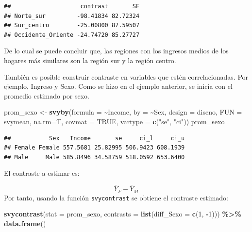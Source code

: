 \documentclass[
  spanish,
  12pt,
]{book}
\newenvironment{Shaded}{\begin{snugshade}}{\end{snugshade}}
\newcommand{\AttributeTok}[1]{\textcolor[rgb]{0.13,0.29,0.53}{#1}}
\newcommand{\ConstantTok}[1]{\textcolor[rgb]{0.56,0.35,0.01}{#1}}
\newcommand{\DecValTok}[1]{\textcolor[rgb]{0.00,0.00,0.81}{#1}}
\newcommand{\FunctionTok}[1]{\textcolor[rgb]{0.13,0.29,0.53}{\textbf{#1}}}
\newcommand{\NormalTok}[1]{#1}
\newcommand{\OtherTok}[1]{\textcolor[rgb]{0.56,0.35,0.01}{#1}}
\newcommand{\SpecialCharTok}[1]{\textcolor[rgb]{0.81,0.36,0.00}{\textbf{#1}}}
\newcommand{\StringTok}[1]{\textcolor[rgb]{0.31,0.60,0.02}{#1}}
\begin{document}
\begin{verbatim}
##                    contrast       SE
## Norte_sur         -98.41834 82.72324
## Sur_centro        -25.00800 87.59507
## Occidente_Oriente -24.74720 85.27727
\end{verbatim}

De lo cual se puede concluir que, las regiones con los ingresos medios de los hogares más similares son la región sur y la región centro.

También es posible construir contraste en variables que estén correlacionadas. Por ejemplo, Ingreso y Sexo. Como se hizo en el ejemplo anterior, se inicia con el promedio estimado por sexo.

\begin{Shaded}
\begin{Highlighting}[]
\NormalTok{prom\_sexo }\OtherTok{\textless{}{-}} \FunctionTok{svyby}\NormalTok{(}\AttributeTok{formula =} \SpecialCharTok{\textasciitilde{}}\NormalTok{Income,}
                   \AttributeTok{by =} \SpecialCharTok{\textasciitilde{}}\NormalTok{Sex,}
                   \AttributeTok{design =}\NormalTok{ diseno,}
                   \AttributeTok{FUN =}\NormalTok{ svymean,}
                   \AttributeTok{na.rm=}\NormalTok{T,}
                   \AttributeTok{covmat =} \ConstantTok{TRUE}\NormalTok{,}
                   \AttributeTok{vartype =} \FunctionTok{c}\NormalTok{(}\StringTok{"se"}\NormalTok{, }\StringTok{"ci"}\NormalTok{))}
\NormalTok{prom\_sexo}
\end{Highlighting}
\end{Shaded}

\begin{verbatim}
##           Sex   Income       se     ci_l     ci_u
## Female Female 557.5681 25.82995 506.9423 608.1939
## Male     Male 585.8496 34.58759 518.0592 653.6400
\end{verbatim}

El contraste a estimar es:

\[ \bar{Y}_{F} - \bar{Y}_{M}\]
Por tanto, usando la función \texttt{svycontrast} se obtiene el contraste estimado:

\begin{Shaded}
\begin{Highlighting}[]
\FunctionTok{svycontrast}\NormalTok{(}\AttributeTok{stat =}\NormalTok{ prom\_sexo,}
            \AttributeTok{contrasts =} \FunctionTok{list}\NormalTok{(}\AttributeTok{diff\_Sexo =} \FunctionTok{c}\NormalTok{(}\DecValTok{1}\NormalTok{, }\SpecialCharTok{{-}}\DecValTok{1}\NormalTok{))) }\SpecialCharTok{\%\textgreater{}\%}
            \FunctionTok{data.frame}\NormalTok{()}
\end{Highlighting}
\end{Shaded}
\end{document}
